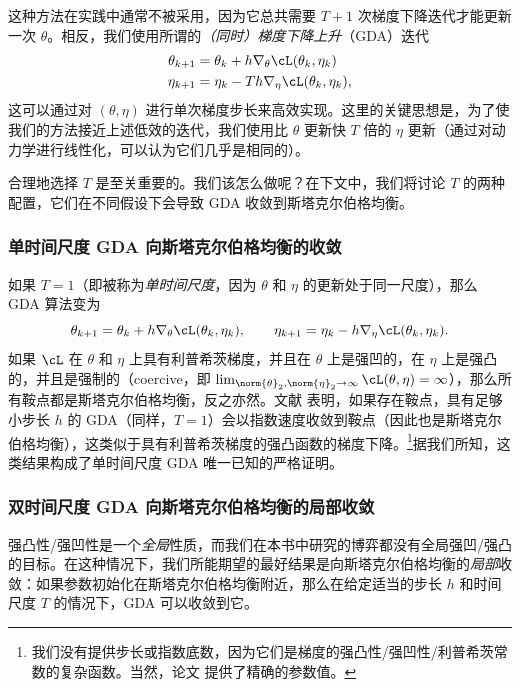 \documentclass[../../book-main_zh.tex]{subfiles}
\begin{document}
这种方法在实践中通常不被采用，因为它总共需要 \(T + 1\) 次梯度下降迭代才能更新一次 \(\theta\)。相反，我们使用所谓的\textit{（同时）梯度下降上升}（GDA）迭代
\begin{align}
    \theta_{k + 1}
    &= \theta_{k} + h\nabla_{\theta}\cL(\theta_{k}, \eta_{k}) \\
    \eta_{k + 1}
    &= \eta_{k} - Th\nabla_{\eta}\cL(\theta_{k}, \eta_{k}),
\end{align}
这可以通过对 \((\theta, \eta)\) 进行单次梯度步长来高效实现。这里的关键思想是，为了使我们的方法接近上述低效的迭代，我们使用比 \(\theta\) 更新快 \(T\) 倍的 \(\eta\) 更新（通过对动力学进行线性化，可以认为它们几乎是相同的）。

合理地选择 \(T\) 是至关重要的。我们该怎么做呢？在下文中，我们将讨论 \(T\) 的两种配置，它们在不同假设下会导致 GDA 收敛到斯塔克尔伯格均衡。

\subsubsection{单时间尺度 GDA 向斯塔克尔伯格均衡的收敛}

如果 \(T = 1\)（即被称为\textit{单时间尺度}，因为 \(\theta\) 和 \(\eta\) 的更新处于同一尺度），那么 GDA 算法变为
\begin{equation}
    \theta_{k + 1} = \theta_{k} + h\nabla_{\theta}\cL(\theta_{k},
    \eta_{k}), \qquad \eta_{k + 1} = \eta_{k} -
    h\nabla_{\eta}\cL(\theta_{k}, \eta_{k}).
\end{equation}
如果 \(\cL\) 在 \(\theta\) 和 \(\eta\) 上具有利普希茨梯度，并且在 \(\theta\) 上是强凹的，在 \(\eta\) 上是强凸的，并且是强制的（coercive，即 \(\lim_{\norm{\theta}_{2}, \norm{\eta}_{2} \to
\infty}\cL(\theta, \eta) = \infty\)），那么所有鞍点都是斯塔克尔伯格均衡，反之亦然。文献 \cite{zamani2024convergence} 表明，如果存在鞍点，具有足够小步长 \(h\) 的 GDA（同样，\(T = 1\)）会以指数速度收敛到鞍点（因此也是斯塔克尔伯格均衡），这类似于具有利普希茨梯度的强凸函数的梯度下降。\footnote{我们没有提供步长或指数底数，因为它们是梯度的强凸性/强凹性/利普希茨常数的复杂函数。当然，论文 \cite{zamani2024convergence} 提供了精确的参数值。}据我们所知，这类结果构成了单时间尺度 GDA 唯一已知的严格证明。

\subsubsection{双时间尺度 GDA 向斯塔克尔伯格均衡的局部收敛}

强凸性/强凹性是一个\textit{全局}性质，而我们在本书中研究的博弈都没有全局强凹/强凸的目标。在这种情况下，我们所能期望的最好结果是向斯塔克尔伯格均衡的\textit{局部}收敛：如果参数初始化在斯塔克尔伯格均衡附近，那么在给定适当的步长 \(h\) 和时间尺度 \(T\) 的情况下，GDA 可以收敛到它。
\end{document}
